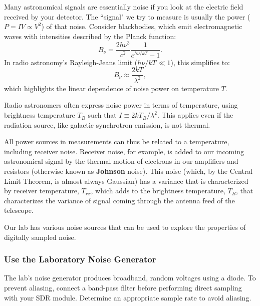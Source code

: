 \documentclass[11pt,preprint]{aastex}
\begin{document}
Many astronomical signals are essentially noise if you look at the electric field received by your detector. The ``signal" we try to measure is usually the power ($P=IV\propto V^2$) of that noise. Consider blackbodies, which emit electromagnetic waves with intensities described by the Planck function:
\begin{equation}
B_\nu = \frac{2h\nu^3}{c^2}\frac{1}{e^{h\nu/kT}-1}.
\end{equation}
In radio astronomy's Rayleigh-Jeans limit ($h\nu/kT \ll 1$), this simplifies to:
\begin{equation}
B_\nu\approx\frac{2kT}{\lambda^2},
\end{equation}
which highlights the linear dependence of noise power on temperature $T$.

Radio astronomers often express noise power in terms of temperature, using brightness temperature $T_B$ such that $I\equiv2kT_B/\lambda^2$. This applies even if the radiation source, like galactic synchrotron emission, is not thermal.

All power sources in measurements can thus be related to a temperature, including receiver noise.
Receiver noise, for example, is added to our incoming astronomical signal 
by the thermal motion of electrons in our amplifiers and resistors 
(otherwise known as {\bf Johnson} noise).  This noise (which,
by the Central Limit Theorem, is almost always Gaussian) has a variance that
is characterized by receiver temperature, $T_{rx}$, which adds to the brightness temperature, $T_B$, 
that characterizes the variance of signal coming through the antenna feed of the telescope.

Our lab has various noise sources that can be used to explore the properties of digitally sampled noise.


\subsubsection{Use the Laboratory Noise Generator}

\noindent
The lab's noise generator produces broadband, random voltages using a diode. To prevent aliasing, connect a band-pass filter before performing direct sampling with your SDR module. Determine an appropriate sample rate to avoid aliasing.
\end{document}
